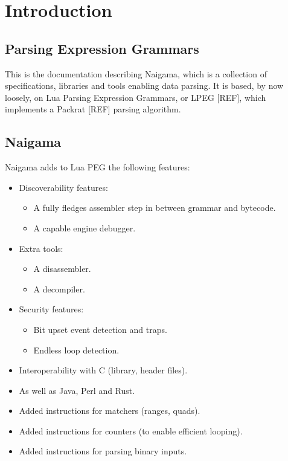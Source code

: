 \section{Introduction}

\subsection{Parsing Expression Grammars}

This is the documentation describing Naigama, which is a collection of
specifications, libraries and tools enabling data parsing. It is based, by
now loosely, on Lua Parsing Expression Grammars, or LPEG [REF], which
implements a Packrat [REF] parsing algorithm.

\subsection{Naigama}

Naigama adds to Lua PEG the following features:

\begin{itemize}
\item Discoverability features:

  \begin{itemize}
  \item A fully fledges assembler step in between grammar and bytecode.
  \item A capable engine debugger.
  \end{itemize}

\item Extra tools:

  \begin{itemize}
  \item A disassembler.
  \item A decompiler.
  \end{itemize}

\item Security features:

  \begin{itemize}
  \item Bit upset event detection and traps.
  \item Endless loop detection.
  \end{itemize}

\item Interoperability with C (library, header files).
\item As well as Java, Perl and Rust.
\item Added instructions for matchers (ranges, quads).
\item Added instructions for counters (to enable efficient looping).
\item Added instructions for parsing binary inputs.
\end{itemize}
